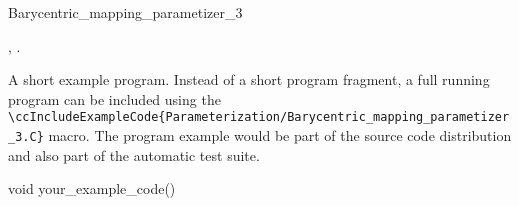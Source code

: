 \begin{ccRefClass}{Barycentric_mapping_parametizer_3}
\ccOperations

\ccGlue
{}
\ccGlue
{}
\ccGlue
{}
\ccGlue
{}
\ccGlue
{}


\ccSeeAlso

,
.

\ccExample

A short example program.
Instead of a short program fragment, a full running program can be
included using the 
\verb|\ccIncludeExampleCode{Parameterization/Barycentric_mapping_parametizer_3.C}| 
macro. The program example would be part of the source code distribution and
also part of the automatic test suite.

\begin{ccExampleCode}
void your_example_code() {
}
\end{ccExampleCode}


\end{ccRefClass}


